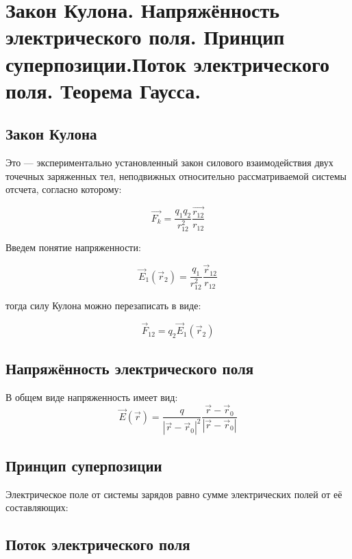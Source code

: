 
	\section{Закон Кулона. Напряжённость электрического поля. Принцип
суперпозиции.Поток электрического поля. Теорема Гаусса.}

\subsection*{Закон Кулона}

Это — экспериментально установленный закон силового взаимодействия двух
точечных заряженных тел, неподвижных относительно рассматриваемой системы
отсчета, согласно которому:

\[\boxed{\vec{F_k}=\frac{q_1q_2}{r_{12}^2}\frac{\vec{r_{12}}}{r_{12}}}\]


Введем понятие напряженности:

\[\boxed{\vec{E}_1(\vec{r}_2) = \frac{q_1}{r_{12}^2} \frac{\vec{r}_{12}}{r_{12}}}\]

тогда силу Кулона можно перезаписать в виде:

\[\vec{F}_{12} = q_2 \vec{E}_1(\vec{r}_2)\]

\subsection*{Напряжённость электрического поля}

В общем виде напряженность имеет вид:
\[\boxed{\vec{E}(\vec{r}) = \frac{q}{|\vec{r} - \vec{r}_0|^2} \frac{\vec{r} -
\vec{r}_0}{|\vec{r} - \vec{r}_0|}}\]


\subsection*{Принцип суперпозиции}

Электрическое поле от системы зарядов равно сумме электрических полей от её
составляющих:


\subsection*{Поток электрического поля}

